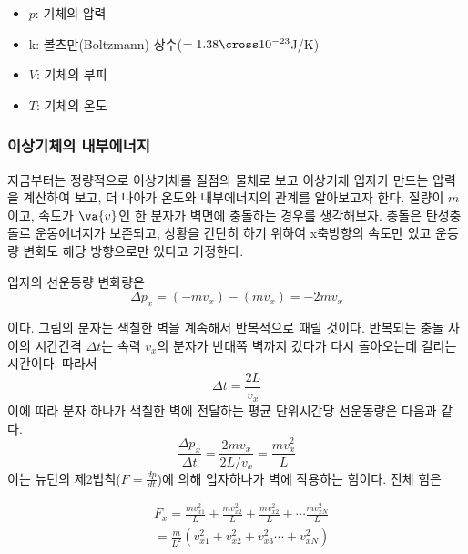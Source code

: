 \begin{flushleft}
\begin{defn}
  \begin{itemize}
    \item  $p$: 기체의 압력
    \item k: 볼츠만(Boltzmann) 상수($=1.38\cross 10^{-23} $J/K)
    \item $V$: 기체의 부피
    \item $T$: 기체의 온도
  \end{itemize}  
  \end{defn}

 



    \subsubsection*{이상기체의 내부에너지}
지금부터는 정량적으로 이상기체를 질점의 물체로 보고 이상기체 입자가 만드는 압력을 계산하여 보고, 더 나아가 온도와 내부에너지의 
관계를 알아보고자 한다. 질량이 $m$이고, 속도가 $\va{v}$인 한 분자가 벽면에 충돌하는 경우를 생각해보자. 충돌은 탄성충돌로 
운동에너지가 보존되고, 상황을 간단히 하기 위하여 x축방향의 속도만 있고 운동량 변화도 해당 방향으로만 있다고 가정한다. 

입자의 선운동량 변화량은
\begin{equation}
  \Delta p_x=(-mv_x)-(mv_x)=-2mv_x
\end{equation}



이다. 그림의 분자는 색칠한 벽을 계속해서 반복적으로 때릴 것이다. 반복되는 충돌 사이의 시간간격 $\Delta t$는 속력 $v_x$의 분자가
반대쪽 벽까지 갔다가 다시 돌아오는데 걸리는 시간이다. 따라서
   \begin{equation}
  \Delta t=\frac{2L}{v_x}
\end{equation}
이에 따라 분자 하나가 색칠한 벽에 전달하는 평균 단위시간당 선운동량은 다음과 같다.
 \begin{equation}
  \frac{\Delta p_x}{\Delta t}=\frac{2mv_x}{2L/v_x}=\frac{mv_x^2}{L}
\end{equation}
이는 뉴턴의 제2법칙($F=\frac{dp}{dt}$)에 의해 입자하나가 벽에 작용하는 힘이다. 전체 힘은

\begin{align}
  &F_{x}=\frac{mv_{x1}^2}{L}+\frac{mv_{x2}^2}{L}+\frac{mv_{x2}^2}{L}+\cdots\frac{mv_{xN}^2}{L}\\
  &=\frac{m}{L^2}(v^2_{x1}+v^2_{x2}+v^2_{x3}\cdots+v^2_{xN}) 
\end{align}


\end{flushleft}
